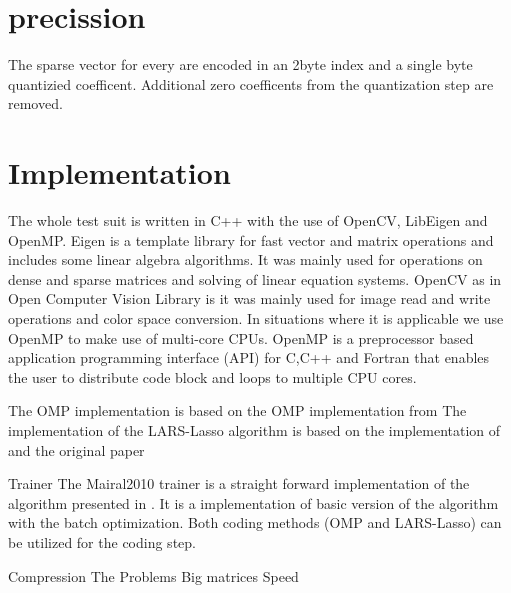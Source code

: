 \section{precission}
The sparse vector for every are encoded in an 2byte index and a single byte quantizied coefficent. Additional zero coefficents from the quantization step are removed.




\section{Implementation}

The whole test suit is written in C++ with the use of OpenCV, LibEigen and OpenMP.
Eigen \cite{Eigen} is a template library for fast vector and matrix operations and includes some linear algebra algorithms.
It was mainly used for operations on dense and sparse matrices and solving of linear equation systems.
OpenCV \cite{OpenCV} as in Open Computer Vision Library is it was mainly used for image read and write operations and color space conversion.
In situations where it is applicable we use OpenMP to make use of multi-core CPUs. OpenMP \cite{OpenMP}
is a preprocessor based application programming interface (API) for C,C++ and Fortran that enables 
the user to distribute code block and loops to multiple CPU cores. 

The OMP implementation is based on the OMP implementation from \cite{Rubinstein}
The implementation of the LARS-Lasso algorithm is based on the implementation of \cite{Strand2005} and the original paper \cite{Efron2004}

Trainer
The Mairal2010 trainer is a straight forward implementation of the algorithm presented in \cite{Mairal2010}.
It is a implementation of basic version of the algorithm with the batch optimization. 
Both coding methods (OMP and LARS-Lasso) can be utilized for the coding step.


Compression
The 
Problems
Big matrices
Speed 

